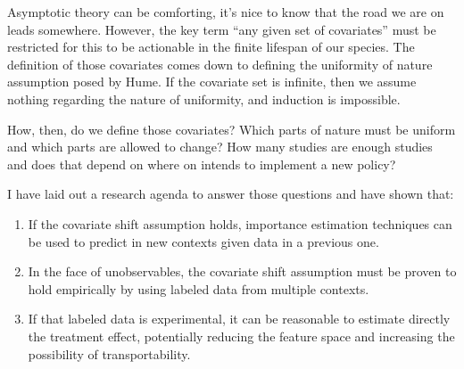 \documentclass[a4paper,12pt]{article}
\begin{document}
Asymptotic theory can be comforting, it's nice to know that the road we are on leads somewhere. However, the key term ``any given set of covariates'' must be restricted for this to be actionable in the finite lifespan of our species. The definition of those covariates comes down to defining the uniformity of nature assumption posed by Hume. If the covariate set is infinite, then we assume nothing regarding the nature of uniformity, and induction is impossible.

How, then, do we define those covariates? Which parts of nature must be uniform and which parts are allowed to change? How many studies are enough studies and does that depend on where on intends to implement a new policy?

I have laid out a research agenda to answer those questions and have shown that:

\begin{enumerate}
\item If the covariate shift assumption holds, importance estimation techniques can be used to predict in new contexts given data in a previous one.
\item In the face of unobservables, the covariate shift assumption must be proven to hold empirically by using labeled data from multiple contexts.
\item If that labeled data is experimental, it can be reasonable to estimate directly the treatment effect, potentially reducing the feature space and increasing the possibility of transportability.
\end{enumerate}






\end{document}
